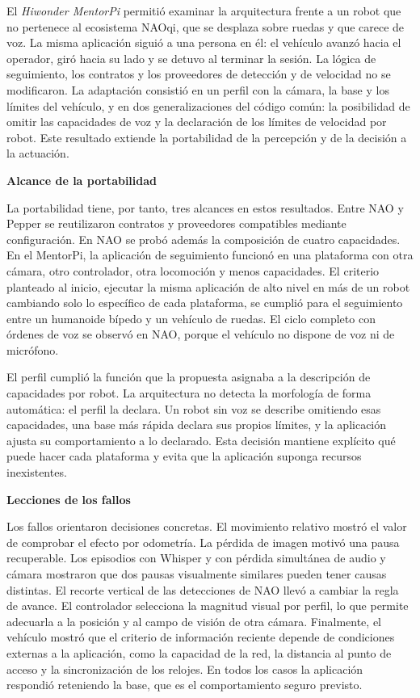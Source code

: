 \documentclass[11pt,letterpaper]{article}
\begin{document}
El \emph{Hiwonder MentorPi} permitió examinar la arquitectura frente a un robot que no pertenece al ecosistema NAOqi, que se desplaza sobre ruedas y que carece de voz. La misma aplicación siguió a una persona en él: el vehículo avanzó hacia el operador, giró hacia su lado y se detuvo al terminar la sesión. La lógica de seguimiento, los contratos y los proveedores de detección y de velocidad no se modificaron. La adaptación consistió en un perfil con la cámara, la base y los límites del vehículo, y en dos generalizaciones del código común: la posibilidad de omitir las capacidades de voz y la declaración de los límites de velocidad por robot. Este resultado extiende la portabilidad de la percepción y de la decisión a la actuación.

\par\medskip\noindent\textbf{Alcance de la portabilidad}\par

La portabilidad tiene, por tanto, tres alcances en estos resultados. Entre NAO y Pepper se reutilizaron contratos y proveedores compatibles mediante configuración. En NAO se probó además la composición de cuatro capacidades. En el MentorPi, la aplicación de seguimiento funcionó en una plataforma con otra cámara, otro controlador, otra locomoción y menos capacidades. El criterio planteado al inicio, ejecutar la misma aplicación de alto nivel en más de un robot cambiando solo lo específico de cada plataforma, se cumplió para el seguimiento entre un humanoide bípedo y un vehículo de ruedas. El ciclo completo con órdenes de voz se observó en NAO, porque el vehículo no dispone de voz ni de micrófono.

El perfil cumplió la función que la propuesta asignaba a la descripción de capacidades por robot. La arquitectura no detecta la morfología de forma automática: el perfil la declara. Un robot sin voz se describe omitiendo esas capacidades, una base más rápida declara sus propios límites, y la aplicación ajusta su comportamiento a lo declarado. Esta decisión mantiene explícito qué puede hacer cada plataforma y evita que la aplicación suponga recursos inexistentes.

\par\medskip\noindent\textbf{Lecciones de los fallos}\par

Los fallos orientaron decisiones concretas. El movimiento relativo mostró el valor de comprobar el efecto por odometría. La pérdida de imagen motivó una pausa recuperable. Los episodios con Whisper y con pérdida simultánea de audio y cámara mostraron que dos pausas visualmente similares pueden tener causas distintas. El recorte vertical de las detecciones de NAO llevó a cambiar la regla de avance. El controlador selecciona la magnitud visual por perfil, lo que permite adecuarla a la posición y al campo de visión de otra cámara. Finalmente, el vehículo mostró que el criterio de información reciente depende de condiciones externas a la aplicación, como la capacidad de la red, la distancia al punto de acceso y la sincronización de los relojes. En todos los casos la aplicación respondió reteniendo la base, que es el comportamiento seguro previsto.
\end{document}
